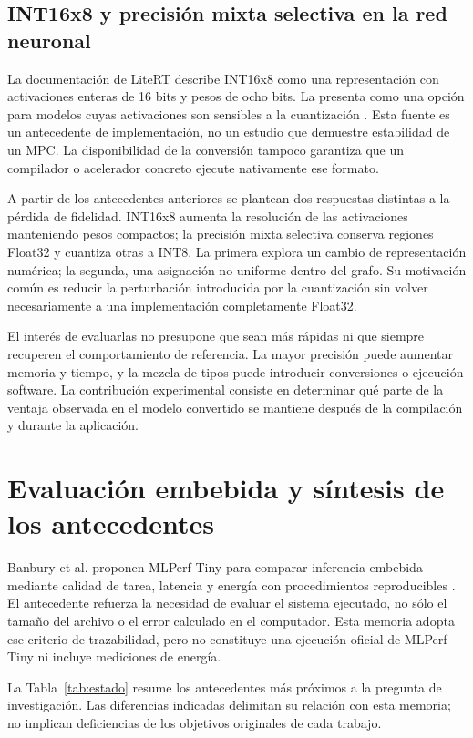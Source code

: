 \subsection{INT16x8 y precisión mixta selectiva en la red neuronal}
La documentación de LiteRT describe INT16x8 como una representación con activaciones enteras de 16 bits y pesos de ocho bits. La presenta como una opción para modelos cuyas activaciones son sensibles a la cuantización \cite{litert16}. Esta fuente es un antecedente de implementación, no un estudio que demuestre estabilidad de un MPC. La disponibilidad de la conversión tampoco garantiza que un compilador o acelerador concreto ejecute nativamente ese formato.

A partir de los antecedentes anteriores se plantean dos respuestas distintas a la pérdida de fidelidad. INT16x8 aumenta la resolución de las activaciones manteniendo pesos compactos; la precisión mixta selectiva conserva regiones Float32 y cuantiza otras a INT8. La primera explora un cambio de representación numérica; la segunda, una asignación no uniforme dentro del grafo. Su motivación común es reducir la perturbación introducida por la cuantización sin volver necesariamente a una implementación completamente Float32.

El interés de evaluarlas no presupone que sean más rápidas ni que siempre recuperen el comportamiento de referencia. La mayor precisión puede aumentar memoria y tiempo, y la mezcla de tipos puede introducir conversiones o ejecución software. La contribución experimental consiste en determinar qué parte de la ventaja observada en el modelo convertido se mantiene después de la compilación y durante la aplicación.

\section{Evaluación embebida y síntesis de los antecedentes}
Banbury et al. proponen MLPerf Tiny para comparar inferencia embebida mediante calidad de tarea, latencia y energía con procedimientos reproducibles \cite{banbury2021}. El antecedente refuerza la necesidad de evaluar el sistema ejecutado, no sólo el tamaño del archivo o el error calculado en el computador. Esta memoria adopta ese criterio de trazabilidad, pero no constituye una ejecución oficial de MLPerf Tiny ni incluye mediciones de energía.

La Tabla~\ref{tab:estado} resume los antecedentes más próximos a la pregunta de investigación. Las diferencias indicadas delimitan su relación con esta memoria; no implican deficiencias de los objetivos originales de cada trabajo.

